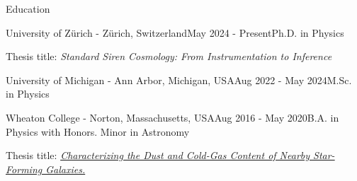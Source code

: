 \documentclass{resume} %
\begin{document}
\begin{rSection}{Education}
    \begin{rSubsection}
        {University of Zürich - Zürich, Switzerland}{May 2024 - Present}{Ph.D. in Physics}{}
        
        Thesis title: \textit{Standard Siren Cosmology: From Instrumentation to Inference}
    \end{rSubsection}
    
    \begin{rSubsection}
        {University of Michigan - Ann Arbor, Michigan, USA}{Aug 2022 - May 2024}{M.Sc. in Physics}{}
    \end{rSubsection}
        

\begin{rSubsection}{Wheaton College - Norton, Massachusetts, USA}{Aug 2016 - May 2020}{B.A. in Physics with Honors. Minor in Astronomy}{}

    Thesis title: \textit{\href{https://wheatoncollege.as.atlas-sys.com/repositories/2/archival_objects/21957}{Characterizing the Dust and Cold-Gas Content of Nearby Star-Forming Galaxies.}}

\end{rSubsection}


\end{rSection}
\end{document}
